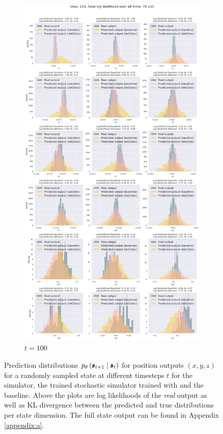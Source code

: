 \begin{figure}
\begin{subfigure}{\textwidth}
\end{subfigure}
\begin{subfigure}{\textwidth}
    \centering
    \includegraphics[trim=0 1650 0 50,clip,width=1.0\textwidth]
    {img/windyslope/output/output_distribution_step100_delta_all}
    \caption{$t=100$}
    \label{fig:output_distribution_step100_posvel_dettostoc}
\end{subfigure}
\caption{Prediction distributions $\ptheta \protect \given*{\vns}{\vs}$ for position outputs $(x,y,z)$ for a randomly sampled state at different timesteps $t$ for the simulator, the trained stochastic simulator trained with \dettostoc{} and the baseline. Above the plots are log likelihoods of the \emph{real} output as well as KL divergence between the predicted and true distributions per state dimension. The full state output can be found in Appendix \ref{appendix:a}.}
\end{figure}

